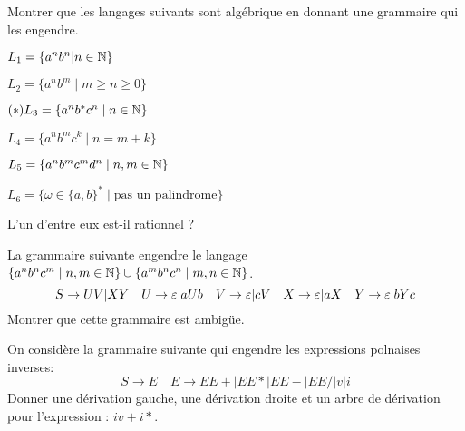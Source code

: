 \documentclass[french]{article}
\begin{document}
\begin{exo}
    Montrer que les langages suivants sont algébrique en donnant une grammaire
    qui les engendre.
    \begin{q}{1}
        \(L_1=\{a^nb^n|n\in\mathbb{N}\}\)
    \end{q}
    \begin{q}{2}
        \(L_2=\{a^nb^m\mid m\geq n\geq 0\}\)
    \end{q}
    \begin{q}{3}
        \((*)L_3=\{a^nb^*c^n\mid n\in\mathbb{N}\}\)
    \end{q}
    \begin{q}{4}
        \(L_4=\{a^nb^mc^k\mid n=m+k\}\)
    \end{q}
    \begin{q}{5}
        \(L_5=\{a^nb^mc^md^n\mid n,m\in\mathbb{N}\}\)
    \end{q}
    \begin{q}{6}
        \(L_6=\{\omega\in\{a,b\}^*\mid \textrm{pas un palindrome}\}\)
    \end{q}
    L'un d'entre eux est-il rationnel ?
\end{exo}

\begin{exo}
    La grammaire suivante engendre le langage \(\{a^nb^nc^m\mid n,m\in\mathbb{N}\}\cup
    \{a^mb^nc^n\mid m,n\in\mathbb{N}\}\).
    \[S\to UV|XY \quad U\to\varepsilon|aUb\quad V\to\varepsilon|cV\quad X\to\varepsilon|aX\quad Y\to\varepsilon|bYc\]
    Montrer que cette grammaire est ambigüe.
\end{exo}

\begin{exo}
    On considère la grammaire suivante qui engendre les expressions polnaises inverses:
    \[S\to E\quad E\to EE+|EE*|EE-|EE/|v|i\]
    Donner une dérivation gauche, une dérivation droite et un arbre de dérivation
    pour l'expression : \(iv+i*\).
\end{exo}
\end{document}
